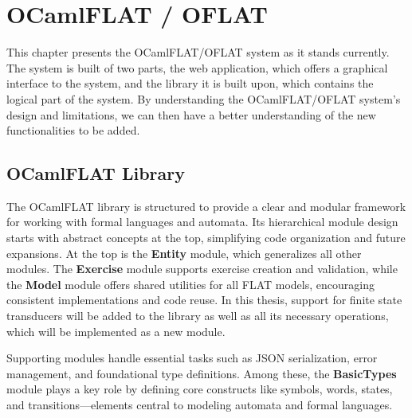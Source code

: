 
%

\chapter{OCamlFLAT / OFLAT}
\label{cha:current_system}

This chapter presents the OCamlFLAT/OFLAT system as it stands currently. The system
is built of two parts, the web application, which offers a graphical interface to
the system, and the library it is built upon, which contains the logical part
of the system. By understanding the OCamlFLAT/OFLAT system's design and limitations,
we can then have a better understanding of the new functionalities to be added.

\section{OCamlFLAT Library}
The OCamlFLAT library is structured to provide a clear and modular framework for working with formal languages and automata. 
Its hierarchical module design starts with abstract concepts at the top, simplifying code organization and future expansions.
At the top is the \textbf{Entity} module, which generalizes all other modules. 
The \textbf{Exercise} module supports exercise creation and validation, while the \textbf{Model} module offers shared utilities for all FLAT models, 
encouraging consistent implementations and code reuse.
In this thesis, support for finite state transducers will be added to the library as well as all its necessary operations, which will be implemented as a new module.

Supporting modules handle essential tasks such as JSON serialization, error management, and foundational type definitions. 
Among these, the \textbf{BasicTypes} module plays a key role by defining core constructs like symbols, words, states, 
and transitions—elements central to modeling automata and formal languages.


